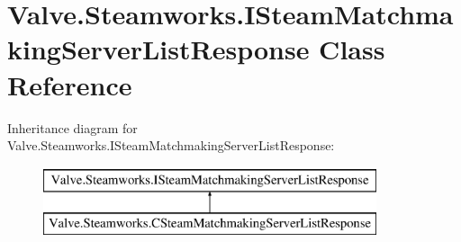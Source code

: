 \hypertarget{classValve_1_1Steamworks_1_1ISteamMatchmakingServerListResponse}{}\section{Valve.\+Steamworks.\+I\+Steam\+Matchmaking\+Server\+List\+Response Class Reference}
\label{classValve_1_1Steamworks_1_1ISteamMatchmakingServerListResponse}
Inheritance diagram for Valve.\+Steamworks.\+I\+Steam\+Matchmaking\+Server\+List\+Response\+:\begin{figure}[H]
\begin{center}
\leavevmode
\includegraphics[height=2.000000cm]{classValve_1_1Steamworks_1_1ISteamMatchmakingServerListResponse}
\end{center}
\end{figure}
